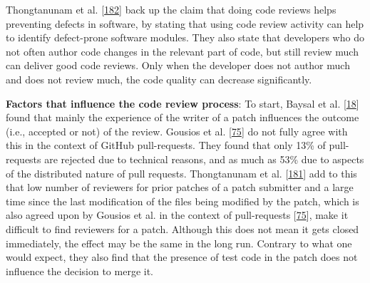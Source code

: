 \documentclass[]{book}
\begin{document}
Thongtanunam et al.
{[}\protect\hyperlink{ref-thongtanunam2016revisiting}{182}{]} back up
the claim that doing code reviews helps preventing defects in software,
by stating that using code review activity can help to identify
defect-prone software modules. They also state that developers who do
not often author code changes in the relevant part of code, but still
review much can deliver good code reviews. Only when the developer does
not author much and does not review much, the code quality can decrease
significantly.

\textbf{Factors that influence the code review process}: To start,
Baysal et al. {[}\protect\hyperlink{ref-baysal2016investigating}{18}{]}
found that mainly the experience of the writer of a patch influences the
outcome (i.e., accepted or not) of the review. Gousios et al.
{[}\protect\hyperlink{ref-gousios2014exploratory}{75}{]} do not fully
agree with this in the context of GitHub pull-requests. They found that
only 13\% of pull-requests are rejected due to technical reasons, and as
much as 53\% due to aspects of the distributed nature of pull requests.
Thongtanunam et al.
{[}\protect\hyperlink{ref-thongtanunam2017review}{181}{]} add to this
that low number of reviewers for prior patches of a patch submitter and
a large time since the last modification of the files being modified by
the patch, which is also agreed upon by Gousios et al. in the context of
pull-requests {[}\protect\hyperlink{ref-gousios2014exploratory}{75}{]},
make it difficult to find reviewers for a patch. Although this does not
mean it gets closed immediately, the effect may be the same in the long
run. Contrary to what one would expect, they also find that the presence
of test code in the patch does not influence the decision to merge it.
\end{document}
